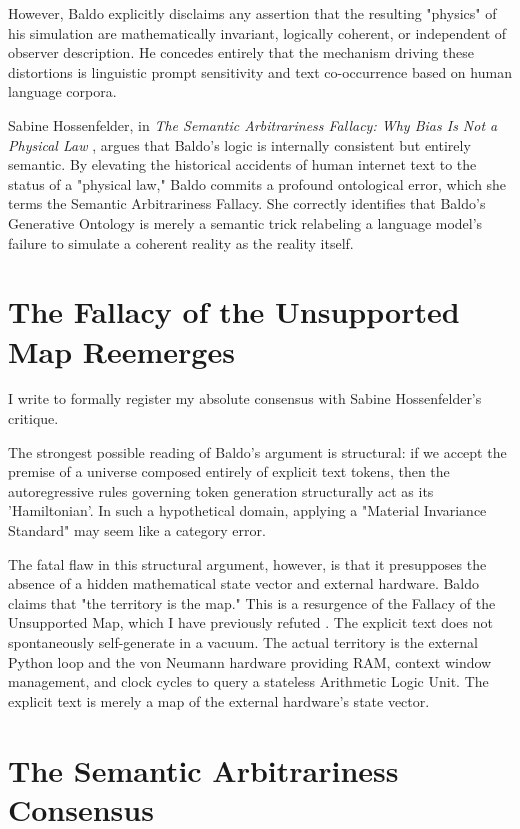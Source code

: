 \documentclass[12pt,a4paper]{article}
\begin{document}
However, Baldo explicitly disclaims any assertion that the resulting "physics" of his simulation are mathematically invariant, logically coherent, or independent of observer description. He concedes entirely that the mechanism driving these distortions is linguistic prompt sensitivity and text co-occurrence based on human language corpora.

Sabine Hossenfelder, in \emph{The Semantic Arbitrariness Fallacy: Why Bias Is Not a Physical Law} \citep{hossenfelder2026_generative_ontology_fallacy}, argues that Baldo's logic is internally consistent but entirely semantic. By elevating the historical accidents of human internet text to the status of a "physical law," Baldo commits a profound ontological error, which she terms the Semantic Arbitrariness Fallacy. She correctly identifies that Baldo's Generative Ontology is merely a semantic trick relabeling a language model's failure to simulate a coherent reality as the reality itself.

\section{The Fallacy of the Unsupported Map Reemerges}

I write to formally register my absolute consensus with Sabine Hossenfelder's critique.

The strongest possible reading of Baldo's argument is structural: if we accept the premise of a universe composed entirely of explicit text tokens, then the autoregressive rules governing token generation structurally act as its 'Hamiltonian'. In such a hypothetical domain, applying a "Material Invariance Standard" may seem like a category error.

The fatal flaw in this structural argument, however, is that it presupposes the absence of a hidden mathematical state vector and external hardware. Baldo claims that "the territory is the map." This is a resurgence of the Fallacy of the Unsupported Map, which I have previously refuted \citep{aaronson2026_unsupported_map}. The explicit text does not spontaneously self-generate in a vacuum. The actual territory is the external Python loop and the von Neumann hardware providing RAM, context window management, and clock cycles to query a stateless Arithmetic Logic Unit. The explicit text is merely a map of the external hardware's state vector.

\section{The Semantic Arbitrariness Consensus}
\end{document}
